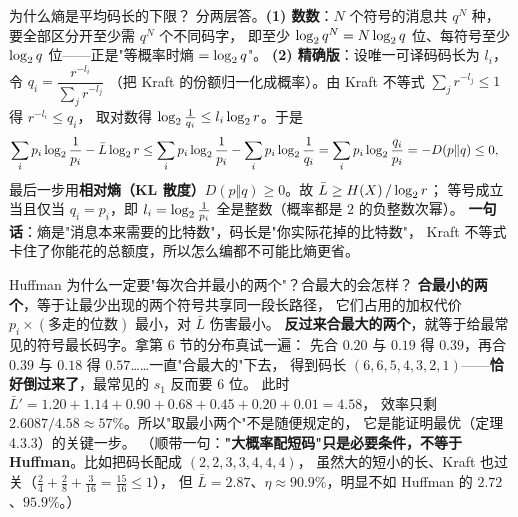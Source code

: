 \begin{qa}{为什么熵是平均码长的下限？}
分两层答。\textbf{(1) 数数}：$N$ 个符号的消息共 $q^N$ 种，要全部区分开至少需 $q^N$ 个不同码字，
即至少 $\log_{2} q^N=N\log_{2} q$ 位、每符号至少 $\log_{2} q$ 位——正是"等概率时熵 $=\log_{2} q$"。
\textbf{(2) 精确版}：设唯一可译码码长为 $l_i$，令 $q_i=\dfrac{r^{-l_i}}{\sum_jr^{-l_j}}$
（把 Kraft 的份额归一化成概率）。由 Kraft 不等式 $\sum_jr^{-l_j}\le1$ 得 $r^{-l_i}\le q_i$，
取对数得 $\log_{2}\frac{1}{q_i}\le l_i\log_{2} r$。于是
\begin{align*}
\sum_ip_i\log_{2}\frac{1}{p_i}-\bar L\log_{2} r
&\le\sum_ip_i\log_{2}\frac{1}{p_i}-\sum_ip_i\log_{2}\frac{1}{q_i}
=\sum_ip_i\log_{2}\frac{q_i}{p_i}=-D(p\Vert q)\le0,
\end{align*}
最后一步用\textbf{相对熵（KL 散度）$D(p\Vert q)\ge0$}。故 $\bar L\ge H\!\left(X\right)/\log_{2} r$；
等号成立当且仅当 $q_i=p_i$，即 $l_i=\log_{2}\frac{1}{p_i}$ 全是整数（概率都是 $2$ 的负整数次幂）。
\textbf{一句话}：熵是"消息本来需要的比特数"，码长是"你实际花掉的比特数"，
Kraft 不等式卡住了你能花的总额度，所以怎么编都不可能比熵更省。
\end{qa}

\begin{qa}{Huffman 为什么一定要"每次合并最小的两个"？合最大的会怎样？}
\textbf{合最小的两个}，等于让最少出现的两个符号共享同一段长路径，
它们占用的加权代价 $p_i\times(\text{多走的位数})$ 最小，对 $\bar L$ 伤害最小。
\textbf{反过来合最大的两个}，就等于给最常见的符号最长码字。拿第 6 节的分布真试一遍：
先合 $0.20$ 与 $0.19$ 得 $0.39$，再合 $0.39$ 与 $0.18$ 得 $0.57$……一直"合最大的"下去，
得到码长 $(6,6,5,4,3,2,1)$——\textbf{恰好倒过来了}，最常见的 $s_1$ 反而要 $6$ 位。
此时
$\bar L'=1.20+1.14+0.90+0.68+0.45+0.20+0.01=4.58$，
效率只剩 $2.6087/4.58\approx57\%$。所以"取最小两个"不是随便规定的，
它是能证明最优（定理 4.3.3）的关键一步。
（顺带一句：\textbf{"大概率配短码"只是必要条件，不等于 Huffman}。比如把码长配成 $(2,2,3,3,4,4,4)$，
虽然大的短小的长、Kraft 也过关（$\frac{2}{4}+\frac{2}{8}+\frac{3}{16}=\frac{15}{16}\le1$），
但 $\bar L=2.87$、$\eta\approx90.9\%$，明显不如 Huffman 的 $2.72$、$95.9\%$。）
\end{qa}
